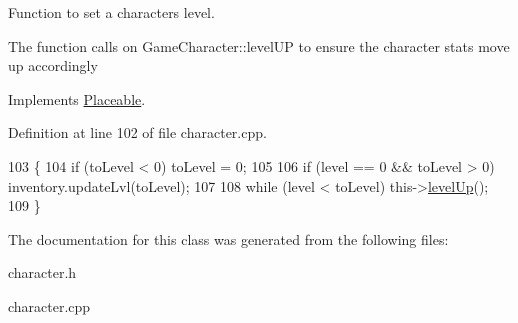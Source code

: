 Function to set a characters level. 

The function calls on Game\+Character\+::level\+UP to ensure the character stats move up accordingly 

Implements \hyperlink{class_placeable}{Placeable}.



Definition at line 102 of file character.\+cpp.


\begin{DoxyCode}
103 \{
104     \textcolor{keywordflow}{if} (toLevel < 0) toLevel = 0;
105 
106     \textcolor{keywordflow}{if} (level == 0 && toLevel > 0) inventory.updateLvl(toLevel);
107     
108     \textcolor{keywordflow}{while} (level < toLevel) this->\hyperlink{class_game_character_a367a537148a995677d9649b975cb326b}{levelUp}();
109 \}
\end{DoxyCode}


The documentation for this class was generated from the following files\+:\begin{DoxyCompactItemize}
\item 
character.\+h\item 
character.\+cpp\end{DoxyCompactItemize}
